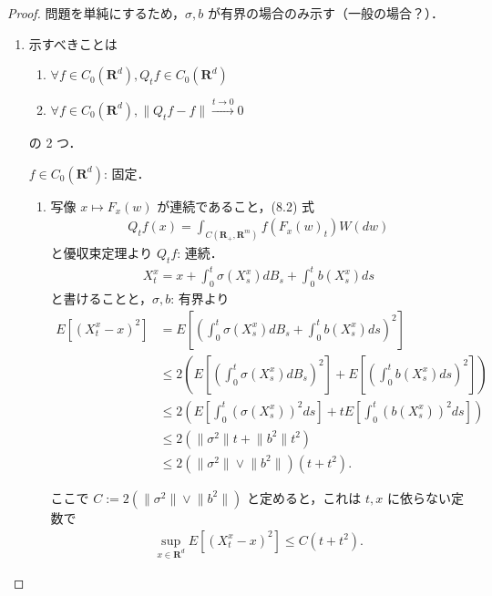 \documentclass{jsarticle}
\begin{document}
\begin{proof}
    問題を単純にするため，$\sigma, b$ が有界の場合のみ示す（一般の場合？）．
    \begin{enumerate}[label=(\arabic*)]
        \item
        示すべきことは
        \begin{enumerate}[label=(\roman*)]
            \item
            $\forall f\in C_{0}(\mathbf{R}^d), Q_{t}f\in C_{0}(\mathbf{R}^d)$
            \item
            $\forall f\in C_{0}(\mathbf{R}^d), \lVert Q_{t}f-f\rVert\xrightarrow{t\to0}0$
        \end{enumerate}
        の 2 つ．

        $f\in C_{0}(\mathbf{R}^d)$: 固定．
        \begin{enumerate}[label=(\roman*)]
            \item
            写像 $x\mapsto F_{x}(w)$ が連続であること，(8.2) 式
            \begin{align}
                Q_{t}f(x)
                = \int_{C(\mathbf{R_+}, \mathbf{R}^{m})}f(F_{x}(w)_{t})W(dw)
            \end{align}
            と優収束定理より $Q_{t}f$: 連続\nazo．
            \begin{align}
                X_{t}^{x}
                = x
                + \int_{0}^{t}\sigma(X_{s}^{x})dB_{s}
                + \int_{0}^{t}b(X_{s}^{x})ds
            \end{align}
            と書けることと，$\sigma, b$: 有界より
            \begin{align}
                E[(X_{t}^{x}-x)^2]
                &= E[(\int_{0}^{t}\sigma(X_{s}^{x})dB_{s}
                + \int_{0}^{t}b(X_{s}^{x})ds)^2] \\
                &\le 2(E[(\int_{0}^{t}\sigma(X_{s}^{x})dB_{s})^2]
                + E[(\int_{0}^{t}b(X_{s}^{x})ds)^2]) \\
                &\le 2(E[\int_{0}^{t}(\sigma(X_{s}^{x}))^{2}ds]
                + tE[\int_{0}^{t}(b(X_{s}^{x}))^{2}ds]) \\
                &\le 2(\lVert \sigma^2\rVert t+\lVert b^2\rVert t^2) \\
                &\le 2(\lVert \sigma^2\rVert\vee\lVert b^2\rVert)(t+t^2).
            \end{align}

            ここで $C:=2(\lVert \sigma^2\rVert\vee\lVert b^2\rVert)$ と定めると，これは $t, x$ に依らない定数で
            \setcounter{equation}{3}
            \begin{align}
                \sup_{x\in\mathbf{R}^d}E[(X_{t}^{x}-x)^2]
                \le C(t+t^2).
                \label{eq:804}
            \end{align}


\end{enumerate}
\end{enumerate}
\end{proof}
\end{document}
